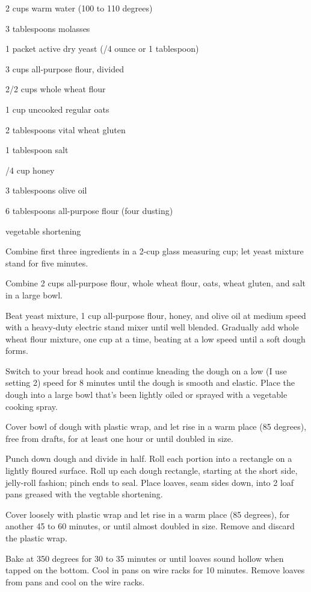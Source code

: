 \begin{IngredientsAndSteps}
    \ListIngredientsAndSteps
    {
        2 cups warm water (100 to 110 degrees)

        3 tablespoons molasses

        1 packet active dry yeast (/4 ounce or 1 tablespoon)

        3 cups all-purpose flour, divided

        2/2 cups whole wheat flour

        1 cup uncooked regular oats

        2 tablespoons vital wheat gluten

        1 tablespoon salt

        /4 cup honey

        3 tablespoons olive oil

        6 tablespoons all-purpose flour (four dusting)

        vegetable shortening
    }
    {
        Combine first three ingredients in a 2-cup glass measuring cup; let yeast
        mixture stand for five minutes.

        Combine 2 cups all-purpose flour, whole wheat flour, oats, wheat gluten, and salt in a large bowl.

        Beat yeast mixture, 1 cup all-purpose flour, honey, and olive oil at medium speed with
        a heavy-duty electric stand mixer until well blended. Gradually add whole wheat flour
        mixture, one cup at a time, beating at a low speed until a soft dough forms.

        Switch to your bread hook and continue kneading the dough on a low (I use setting 2)
        speed for 8 minutes until the dough is smooth and elastic. Place the dough into a
        large bowl that's been lightly oiled or sprayed with a vegetable cooking spray.

        Cover bowl of dough with plastic wrap, and let rise in a warm place (85 degrees), free from
        drafts, for at least one hour or until doubled in size.

        Punch down dough and divide in half. Roll each portion into a  rectangle on a
        lightly floured surface. Roll up each dough rectangle, starting at the short side,
        jelly-roll fashion; pinch ends to seal. Place loaves, seam sides down, into
        2 
        loaf pans greased with the vegtable shortening.

        Cover loosely with plastic wrap and let rise in a warm place (85 degrees), for another
        45 to 60 minutes, or until almost doubled in size. Remove and discard the plastic wrap.

        Bake at 350 degrees for 30 to 35 minutes or until loaves sound hollow when tapped on the bottom.
        Cool in pans on wire racks for 10 minutes. Remove loaves from pans and cool on the wire racks.
    }
\end{IngredientsAndSteps}

